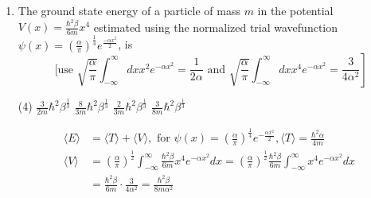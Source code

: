 \begin{enumerate}
\begin{tasks}
\task[\textbf{C.}] $\left(n+\frac{1}{2}\right)^{5 / 3} \lambda^{1 / 3}$
\task[\textbf{D.}] $\left(n+\frac{1}{2}\right)^{5 / 3} \lambda^{2 / 3}$
\end{tasks}
\begin{answer}
\begin{align*}
\intertext{From W.K.B approximation}\\
&4. \int_{0}^{x} P d x \propto\left(n+\frac{1}{2}\right) h\\
&4 \int_{0}^{\left(\frac{E}{\lambda}\right)^{1 / 4}} \sqrt{2 m\left(E-\lambda x^{4} d x\right)} \propto\left(n+\frac{1}{2}\right) h
\intertext{making the integration dimensional}
&4 \times(2 m E)^{1 / 2}\left(\frac{E}{\lambda}\right)^{1 / 4} \int_{0}^{1} \sqrt{1-t^{4}} d t \propto\left(n+\frac{1}{2}\right) \\&\Rightarrow E^{3 / 4} \propto\left(n+\frac{1}{2}\right) \lambda^{1 / 4} \Rightarrow E \propto\left(n+\frac{1}{2}\right)^{4 / 3} \lambda^{1 / 3}
\end{align*}
So the correct answer is \textbf{Option (A)}
\end{answer}	
\item The ground state energy of a particle of mass $m$ in the potential $V(x)=\frac{\hbar^{2} \beta}{6 m} x^{4}$ estimated using the normalized trial wavefunction $\psi(x)=\left(\frac{\alpha}{\pi}\right)^{\frac{1}{4}} e^{\frac{-\alpha x^{2}}{2}}$, is
$$
\text { [use } \left.\sqrt{\frac{\alpha}{\pi}} \int_{-\infty}^{\infty} d x x^{2} e^{-\alpha x^{2}}=\frac{1}{2 \alpha} \text { and } \sqrt{\frac{\alpha}{\pi}} \int_{-\infty}^{\infty} d x x^{4} e^{-\alpha x^{2}}=\frac{3}{4 \alpha^{2}}\right]
$$
{}
\begin{tasks}(4)
\task[\textbf{A.}] $\frac{3}{2 m} \hbar^{2} \beta^{\frac{1}{3}}$
\task[\textbf{B.}] $\frac{8}{3 m} \hbar^{2} \beta^{\frac{1}{3}}$
\task[\textbf{C.}] $\frac{2}{3 m} \hbar^{2} \beta^{\frac{1}{3}}$
\task[\textbf{D.}] $\frac{3}{8 m} \hbar^{2} \beta^{\frac{1}{3}}$
\end{tasks}
\begin{answer}
\begin{align*}
\langle E\rangle&=\langle T\rangle+\langle V\rangle,\text{ for } \psi(x)=\left(\frac{\alpha}{\pi}\right)^{\frac{1}{4}} e^{-\frac{\alpha x^{2}}{2}},\langle T\rangle=\frac{\hbar^{2} \alpha}{4 m}\\
\langle V\rangle&=\left(\frac{\alpha}{\pi}\right)^{\frac{1}{2}} \int_{-\infty}^{\infty} \frac{\hbar^{2} \beta}{6 m} x^{4} e^{-\alpha x^{2}} d x=\left(\frac{\alpha}{\pi}\right)^{\frac{1}{2}} \frac{\hbar^{2} \beta}{6 m} \int_{-\infty}^{\infty} x^{4} e^{-\alpha x^{2}} d x\\&=\frac{\hbar^{2} \beta}{6 m} \cdot \frac{3}{4 \alpha^{2}}=\frac{\hbar^{2} \beta}{8 m \alpha^{2}}\\

\end{align*}
\end{answer}
\end{enumerate}
